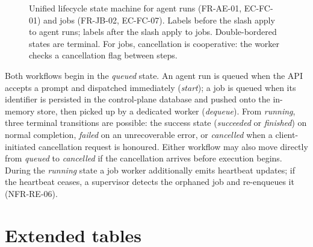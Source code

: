 \documentclass[a4paper,noexaminfo]{sapthesis}
\begin{document}
\begin{figure}[ht]
\centering
{}
\caption{Unified lifecycle state machine for agent runs (FR-AE-01,
    EC-FC-01) and jobs (FR-JB-02, EC-FC-07).  Labels before the slash
    apply to agent runs; labels after the slash apply to jobs.
    Double-bordered states are terminal.  For jobs, cancellation is
    cooperative: the worker checks a cancellation flag between steps.}
\label{fig:lifecycle-sm}
\label{fig:run-sm}
\label{fig:job-sm}
\end{figure}

Both workflows begin in the \emph{queued} state.  An agent run is
queued when the API accepts a prompt and dispatched immediately
(\emph{start}); a job is queued when its identifier is persisted in the
control-plane database and pushed onto the in-memory store, then picked
up by a dedicated worker (\emph{dequeue}).  From \emph{running}, three
terminal transitions are possible: the success state (\emph{succeeded}
or \emph{finished}) on normal completion, \emph{failed} on an
unrecoverable error, or \emph{cancelled} when a client-initiated
cancellation request is honoured.  Either workflow may also move
directly from \emph{queued} to \emph{cancelled} if the cancellation
arrives before execution begins.  During the \emph{running} state a job
worker additionally emits heartbeat updates; if the heartbeat ceases, a
supervisor detects the orphaned job and re-enqueues it (NFR-RE-06).


\section{Extended tables}
\label{app:extended-tables}
\end{document}
